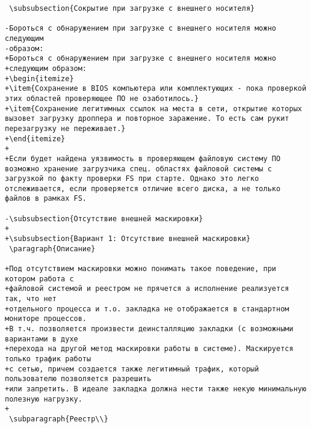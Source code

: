 \begin{verbatim}
 \subsubsection{Сокрытие при загрузке с внешнего носителя}

-Бороться с обнаружением при загрузке с внешнего носителя можно следующим
-образом:
+Бороться с обнаружением при загрузке с внешнего носителя можно
+следующим образом:
+\begin{itemize}
+\item{Сохранение в BIOS компьютера или комплектующих - пока проверкой этих областей проверяющее ПО не озаботилось.}
+\item{Сохранение легитимных ссылок на места в сети, открытие которых вызовет загрузку дроппера и повторное заражение. То есть сам рукит перезагрузку не переживает.}
+\end{itemize}
+
+Если будет найдена уязвимость в проверяющем файловую систему ПО возможно хранение загрузчика спец. областях файловой системы с загрузкой по факту проверки FS при старте. Однако это легко отслеживается, если проверяется отличие всего диска, а не только файлов в рамках FS.

-\subsubsection{Отсутствие внешней маскировки}
+
+\subsubsection{Вариант 1: Отсутствие внешней маскировки}
 \paragraph{Описание}

+Под отсутствием маскировки можно понимать такое поведение, при котором работа с
+файловой системой и реестром не прячется а исполнение реализуется так, что нет
+отдельного процесса и т.о. закладка не отображается в стандартном мониторе процессов.
+В т.ч. позволяется произвести деинсталляцию закладки (с возможными вариантами в духе
+перехода на другой метод маскировки работы в системе). Маскируется только трафик работы
+с сетью, причем создается также легитимный трафик, который пользователю позволяется разрешить
+или запретить. В идеале закладка должна нести также некую минимальную полезную нагрузку.
+
 \subparagraph{Реестр\\}


\end{verbatim}
